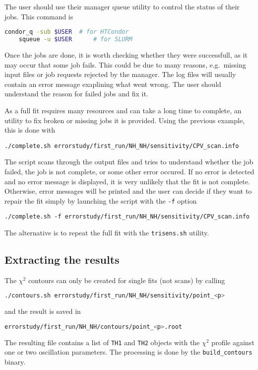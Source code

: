 \documentclass[a4paper, 11pt]{article}
\begin{document}
The user should use their manager queue utility to control the status of their jobs.
This command is
\begin{lstlisting}[language=bash]
	condor_q -sub $USER  # for HTCondor
	squeue -u $USER      # for SLURM
\end{lstlisting}
Once the jobs are done, it is worth checking whether they were successfull, %
as it may occur that some job fails.
This could be due to many reasons, e.g.\ missing input files or job requests rejected by the manager.
The log files will usually contain an error message exaplining what went wrong.
The user should understand the reason for failed jobs and fix it.

As a full fit requires many resources and can take a long time to complete, %
an utility to fix broken or missing jobs it is provided.
Using the previous example, this is done with
\begin{lstlisting}[]
	./complete.sh errorstudy/first_run/NH_NH/sensitivity/CPV_scan.info
\end{lstlisting}
The script scans through the output files and tries to understand whether the job failed, the job is not complete, or some other error occured.
If no error is detected and no error message is displayed, it is very unlikely that the fit is not complete.
Otherwise, error messages will be printed and the user can decide if they want to repair the fit %
simply by launching the script with the \texttt{-f} option
\begin{lstlisting}[]
	./complete.sh -f errorstudy/first_run/NH_NH/sensitivity/CPV_scan.info
\end{lstlisting}
The alternative is to repeat the full fit with the \texttt{trisens.sh} utility.

\subsection{Extracting the results}

The $\chi^2$ contours can only be created for single fits (not scans) by calling
\begin{lstlisting}[language=bash]
	./contours.sh errorstudy/first_run/NH_NH/sensitivity/point_<p>
\end{lstlisting}
and the result is saved in 
\begin{lstlisting}[language=bash]
	errorstudy/first_run/NH_NH/contours/point_<p>.root
\end{lstlisting}
The resulting file contains a list of \texttt{TH1} and \texttt{TH2} objects with the %
$\chi^2$ profile against one or two oscillation parameters.
The processing is done by the \texttt{build\_contours} binary.
\end{document}
